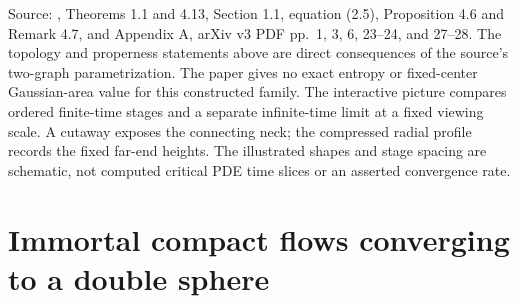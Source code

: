 \begin{example}
Source: \cite{CatCS26R3}, Theorems 1.1 and 4.13, Section 1.1, equation (2.5), Proposition 4.6 and Remark 4.7, and Appendix A, arXiv v3 PDF pp.~1, 3, 6, 23--24, and 27--28. The topology and properness statements above are direct consequences of the source's two-graph parametrization. The paper gives no exact entropy or fixed-center Gaussian-area value for this constructed family. The interactive picture compares ordered finite-time stages and a separate infinite-time limit at a fixed viewing scale. A cutaway exposes the connecting neck; the compressed radial profile records the fixed far-end heights. The illustrated shapes and stage spacing are schematic, not computed critical PDE time slices or an asserted convergence rate.
\end{example}

\chapter{Immortal compact flows converging to a double sphere}\label{sec:catalogue-double-sphere-flow}

